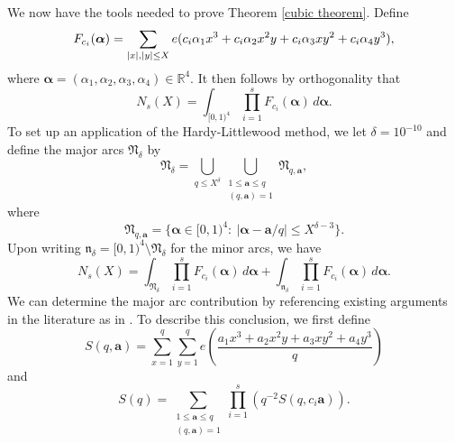 \documentclass{amsart}%
\numberwithin{equation}{section}
\theoremstyle{remark}
\newcommand{\1}{\mathbbm{1}}
\begin{document}
We now have the tools needed to prove Theorem \ref{cubic theorem}. Define
\begin{equation*}\label{F_{cj}}
    F_{c_i}(\boldsymbol{\alpha}) =\sum_{|x|,|y|\leq X}e(c_i\alpha_1x^3+c_i\alpha_2x^{2}y+ c_i\alpha_3xy^2+c_i\alpha_{4}y^3),
\end{equation*}
where $\boldsymbol{\alpha}=(\alpha_1,\alpha_2, \alpha_3,\alpha_{4})\in \mathbb{R}^{4}$. It then follows by orthogonality that
\begin{equation*}
    N_s(X)=\int_{[0,1)^{4}} \prod_{i=1}^s F_{c_i}(\boldsymbol{\alpha}) \, d\boldsymbol{\alpha}.
\end{equation*}
To set up an application of the Hardy-Littlewood method, we let $\delta = 10^{-10}$ and define the major arcs $\mathfrak{N}_{\delta}$ by
\begin{equation*}
    \mathfrak{N}_{\delta}=\bigcup_{q\leq X^{\delta}}\bigcup_{\substack{1\leq \boldsymbol{a}\leq q\\ (q,\boldsymbol{a})=1}}\mathfrak{N}_{q,\boldsymbol{a}},
\end{equation*}
where
\begin{equation*}
    \mathfrak{N}_{q,\boldsymbol{a}} =\{\boldsymbol{\alpha}\in [0,1)^{4}:\ |\boldsymbol{\alpha}-\boldsymbol{a}/q|\leq X^{\delta-3}\}.
\end{equation*}
Upon writing $\mathfrak{n}_{\delta}=[0,1)^{4}\setminus \mathfrak{N}_{\delta}$ for the minor arcs, we have
\begin{equation}\label{major and minor arcs dissection}
    N_s(X)=\int_{\mathfrak{N}_{\delta}} \prod_{i=1}^s F_{c_i}(\boldsymbol{\alpha})\, d\boldsymbol{\alpha}+\int_{\mathfrak{n}_{\delta}} \prod_{i=1}^s F_{c_i}(\boldsymbol{\alpha}) \, d\boldsymbol{\alpha}.
\end{equation}
We can determine the major arc contribution by referencing existing arguments in the literature as in \cite{ky2026}. To describe this conclusion, we first define
\begin{equation*}
S(q,\boldsymbol{a})=\sum_{x=1}^q\sum_{y=1}^qe\left(\frac{a_1x^3+a_2x^{2}y+a_3xy^{2}+a_{4}y^3}{q}\right)
\end{equation*}
and 
\begin{equation*}
    S(q)=\sum_{\substack{1\leq \boldsymbol{a}\leq q\\(q,\boldsymbol{a})=1}}\prod_{i=1}^s(q^{-2}S(q,c_i\boldsymbol{a})).
\end{equation*}
\end{document}

